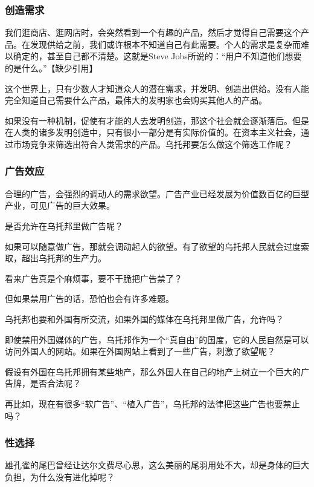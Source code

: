 \subsubsection{创造需求}

我们逛商店、逛网店时，会突然看到一个有趣的产品，然后才觉得自己需要这个产品。在发现供给之前，我们或许根本不知道自己有此需要。个人的需求是复杂而难以确定的，甚至自己都不清楚。这就是Steve Jobs所说的：“用户不知道他们想要的是什么。”【缺少引用】

这个世界上，只有少数人才知道众人的潜在需求，并发明、创造出供给。没有人能完全知道自己需要什么产品，最伟大的发明家也会购买其他人的产品。

如果没有一种机制，促使有才能的人去发明创造，那这个社会就会逐渐落后。但是在人类的诸多发明创造中，只有很小一部分是有实际价值的。在资本主义社会，通过市场竞争来筛选出符合人类需求的产品。乌托邦要怎么做这个筛选工作呢？

\subsubsection{广告效应}

合理的广告，会强烈的调动人的需求欲望。广告产业已经发展为价值数百亿的巨型产业，可见广告的巨大效果。

是否允许在乌托邦里做广告呢？

如果可以随意做广告，那就会调动起人的欲望。有了欲望的乌托邦人民就会过度索取，超出乌托邦的生产力。

看来广告真是个麻烦事，要不干脆把广告禁了？

\zPar

但如果禁用广告的话，恐怕也会有许多难题。

乌托邦也要和外国有所交流，如果外国的媒体在乌托邦里做广告，允许吗？

即使禁用外国媒体的广告，乌托邦作为一个“真自由”的国度，它的人民自然是可以访问外国人的网站。如果在外国网站上看到了一些广告，刺激了欲望呢？

假设有外国在乌托邦拥有某些地产，那么外国人在自己的地产上树立一个巨大的广告牌，是否合法呢？

再比如，现在有很多“软广告”、“植入广告”，乌托邦的法律把这些广告也要禁止吗？

\subsubsection{性选择}

雄孔雀的尾巴曾经让达尔文费尽心思，这么美丽的尾羽用处不大，却是身体的巨大负担，为什么没有进化掉呢？

